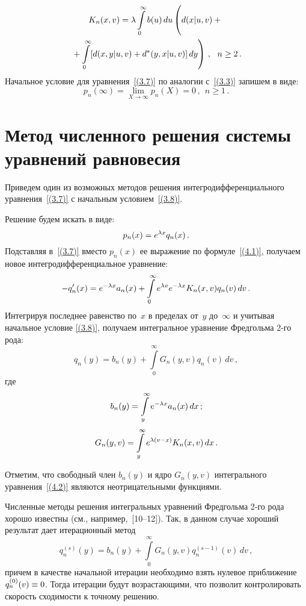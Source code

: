 \begin{multicols}{2}
\noindent
\begin{multline*}
K_n(x,v) = \lambda \int\limits_0^\infty
b(u)\,du \left( \vphantom{\int\limits_0^\infty}
d(x|u,v)
+ {}\right.\\
\left.{}+\int\limits_0^\infty
[d(x,y|u,v) + d^*(y,x|u,v)]
\,dy \right)\,, \ \ n\ge 2\,.
\end{multline*}
Начальное условие для уравнения~\eqref{(3.7)}
по аналогии с~\eqref{(3.3)} запишем в виде:
\begin{equation}
\label{(3.8)}
p_{n}(\infty) = \lim\limits_{X\to \infty}
p_{n}(X) = 0\,,\ \ n\ge 1\,.
\end{equation}

\section{Метод численного решения системы
уравнений равновесия}

Приведем один из возможных методов решения
интегродифференциального уравнения~\eqref{(3.7)}
с начальным условием~\eqref{(3.8)}.

Решение будем искать в виде:
\begin{equation}
\label{(4.1)}
p_n(x) = e^{\lambda x} q_n(x) \,.
\end{equation}
Подставляя в~\eqref{(3.7)} вместо $p_n(x)$
ее выражение по формуле~\eqref{(4.1)}, получаем новое
интегродифференциальное уравнение:
\begin{equation*}
- q'_n(x) = e^{-\lambda x} a_n(x) +
\int\limits_0^\infty e^{\lambda v} e^{-\lambda x} K_n(x,v) q_n(v)\, dv\,.
\end{equation*}
Интегрируя последнее равенство по~$x$ в
пределах от~$y$ до~$\infty$ и учитывая
начальное условие \eqref{(3.8)}, получаем
интегральное уравнение Фредгольма 2-го рода:
\begin{equation*}
q_n(y) = b_n(y) + \int\limits_0^\infty
G_n(y,v) q_n(v)\, dv \,,
\end{equation*}
где
\begin{equation*}
b_n(y) = \int\limits_y^\infty e^{-\lambda x} a_n(x)\, dx\,;
\end{equation*}
\begin{equation}
\label{(4.2)}
G_n(y,v) = \int\limits_y^\infty e^{\lambda (v-x)} K_n(x,v)\, dx\,.
\end{equation}

Отметим, что свободный член $b_n(y)$ и ядро
$G_n(y,v)$ интегрального уравнения~\eqref{(4.2)}
являются неотрицательными функциями.

Численные методы решения интегральных
уравнений Фредгольма 2-го рода хорошо известны
(см., например,~[10--12]).
Так, в данном случае хороший результат дает
итерационный метод
\begin{equation*}
q^{(s)}_n(y) = b_n(y) + \int\limits_0^\infty
G_n(y,v) q^{(s-1)}_n(v)\, dv \,,
\end{equation*}
причем в качестве начальной итерации
необходимо взять нулевое приближение
${q^{(0)}_n(v)\hm\equiv 0}$.
Тогда итерации будут возрастающими, что
позволит контролировать скорость сходимости к точному решению.


\end{multicols}
